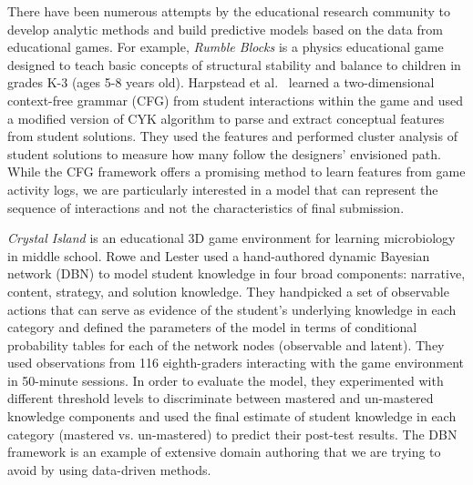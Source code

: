 \documentclass{sigchi}
\begin{document}
	There have been numerous attempts by the educational research community to develop analytic methods and build predictive models based on the data from educational games. 
	For example, \textit {Rumble Blocks} \cite{christel2012rumbleblocks} is a physics educational game designed to teach basic concepts of structural stability and balance to children in grades K-3 (ages 5-8 years old). 
	Harpstead et al.~\cite{harpstead2013investigating} learned a two-dimensional context-free grammar (CFG) from student interactions within the game and used a modified version of CYK algorithm to parse and extract conceptual features from student solutions.
	They used the features and performed cluster analysis of student solutions to measure how many follow the designers' envisioned path. 
	While the CFG framework offers a promising method to learn features from game activity logs, we are particularly interested in a model that can represent the sequence of interactions and not the characteristics of final submission. 
	
	\textit{Crystal Island} \cite{rowe2010integrating} is an educational 3D game environment for learning microbiology in middle school. 
	Rowe and Lester \cite{rowe2010modeling} used a hand-authored dynamic Bayesian network (DBN) to model student knowledge in four broad components: narrative, content, strategy, and solution knowledge. 
	They handpicked a set of observable actions that can serve as evidence of the student's underlying knowledge in each category and defined the parameters of the model in terms of conditional probability tables for each of the network nodes (observable and latent).
	They used observations from 116 eighth-graders interacting with the game environment in 50-minute sessions.
	In order to evaluate the model, they experimented with different threshold levels to discriminate between mastered and un-mastered knowledge components and used the final estimate of student knowledge in each category (mastered vs. un-mastered) to predict their post-test results.
	The DBN framework is an example of extensive domain authoring that we are trying to avoid by using data-driven methods.
	
\end{document}
